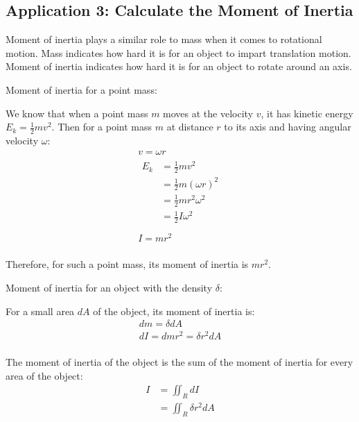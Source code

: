 \documentclass{article}
\begin{document}
\subsection{Application 3: Calculate the Moment of Inertia}

Moment of inertia plays a similar role to mass when it comes to rotational 
motion. Mass indicates how hard it is for an object to impart translation 
motion. Moment of inertia indicates how hard it is for an object to rotate 
around an axis.

Moment of inertia for a point mass:

We know that when a point mass $m$ moves at the velocity $v$, it has kinetic 
energy $E_k = \frac{1}{2}mv^2$. Then for a point mass $m$ at distance $r$ to its 
axis and having angular velocity $\omega$:
\begin{gather*}
  v = \omega r \\
  \begin{split}
    E_k &= \frac{1}{2}mv^2 \\
        &= \frac{1}{2}m(\omega r)^2 \\
        &= \frac{1}{2}mr^2 \omega^2 \\
        &= \frac{1}{2}I \omega^2 \\
  \end{split} \\
  I = mr^2 \\
\end{gather*}

Therefore, for such a point mass, its moment of inertia is $mr^2$.

Moment of inertia for an object with the density $\delta$:

For a small area $dA$ of the object, its moment of inertia is:
\begin{gather*}
  dm = \delta dA \\
  dI = dm r^2 = \delta r^2 dA \\
\end{gather*}

The moment of inertia of the object is the sum of the moment of inertia for 
every area of the object:
\begin{equation*}
  \begin{split}
    I &= \iint_R dI \\
      &= \iint_R \delta r^2 dA \\
  \end{split}
\end{equation*}
\end{document}
